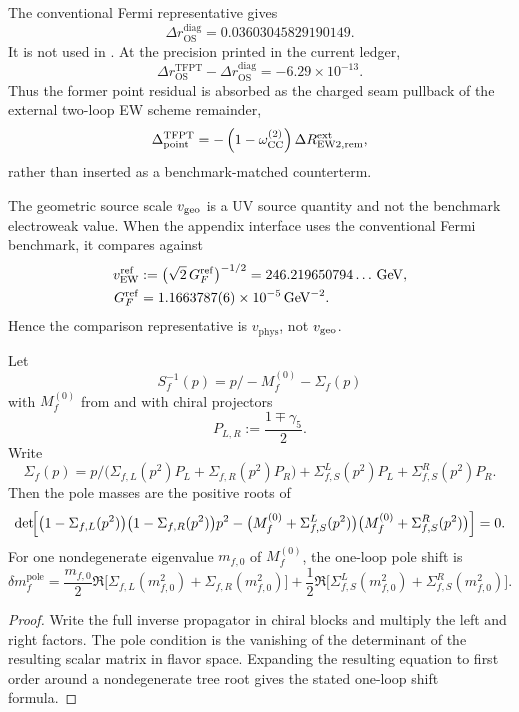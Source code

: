 \begin{remark}
The conventional Fermi representative gives
\[
\Delta r_{\mathrm{OS}}^{\mathrm{diag}}
=
0.03603045829190149.
\]
It is not used in . At the precision printed in the current
ledger,
\[
\Delta r_{\mathrm{OS}}^{\mathrm{TFPT}}
-
\Delta r_{\mathrm{OS}}^{\mathrm{diag}}
=
-6.29\times10^{-13}.
\]
Thus the former point residual is absorbed as the charged seam pullback of the external two-loop EW
scheme remainder,
\[
\Delta_{\mathrm{point}}^{\mathrm{TFPT}}
=
-\left(1-\omega_{\mathrm{CC}}^{(2)}\right)
\Delta R_{\mathrm{EW2},\mathrm{rem}}^{\mathrm{ext}},
\]
rather than inserted as a benchmark-matched counterterm.
\end{remark}
\begin{remark}
The geometric source scale $v_{\mathrm{geo}}$ is a UV source quantity and not the benchmark electroweak value.
When the appendix interface uses the conventional Fermi benchmark, it compares against
\[
\begin{aligned}
v_{\mathrm{EW}}^{\mathrm{ref}}
&:=
\bigl(\sqrt2\,G_F^{\mathrm{ref}}\bigr)^{-1/2}
=
246.219650794\ldots\,\mathrm{GeV},
\\
G_F^{\mathrm{ref}}
&=
1.1663787(6)\times 10^{-5}\,\mathrm{GeV}^{-2}.
\end{aligned}
\]
Hence the comparison representative is $v_{\mathrm{phys}}$, not $v_{\mathrm{geo}}$.
\end{remark}

\begin{theorem}
\label{thm:dirac-pole-matching}
Let
\[
S_f^{-1}(p)=p\!\!\!/-M_f^{(0)}-\Sigma_f(p)
\]
with $M_f^{(0)}$ from  and with chiral projectors
\[
P_{L,R}:=\frac{1\mp\gamma_5}{2}.
\]
Write
\[
\Sigma_f(p)=
p\!\!\!/\bigl(\Sigma_{f,L}(p^2)P_L+\Sigma_{f,R}(p^2)P_R\bigr)
+\Sigma_{f,S}^L(p^2)P_L+\Sigma_{f,S}^R(p^2)P_R.
\]
Then the pole masses are the positive roots of
\[
\det\!\Bigl[
\bigl(1-\Sigma_{f,L}(p^2)\bigr)\bigl(1-\Sigma_{f,R}(p^2)\bigr)p^2
-\bigl(M_f^{(0)}+\Sigma_{f,S}^L(p^2)\bigr)\bigl(M_f^{(0)}+\Sigma_{f,S}^R(p^2)\bigr)
\Bigr]=0.
\]
For one nondegenerate eigenvalue $m_{f,0}$ of $M_f^{(0)}$, the one-loop pole shift is
\[
\delta m_f^{\mathrm{pole}}
=
\frac{m_{f,0}}{2}\Re\bigl[\Sigma_{f,L}(m_{f,0}^2)+\Sigma_{f,R}(m_{f,0}^2)\bigr]
+\frac12\Re\bigl[\Sigma_{f,S}^L(m_{f,0}^2)+\Sigma_{f,S}^R(m_{f,0}^2)\bigr].
\]
\end{theorem}

\begin{proof}
Write the full inverse propagator in chiral blocks and multiply the left and right factors. The
pole condition is the vanishing of the determinant of the resulting scalar matrix in flavor space.
Expanding the resulting equation to first order around a nondegenerate tree root gives the stated
one-loop shift formula.
\end{proof}

